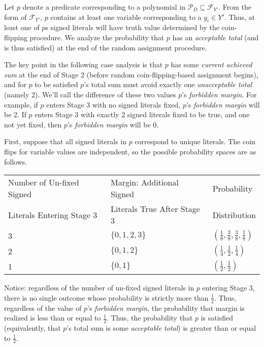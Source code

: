 \documentclass{article}
\begin{document}
Let $p$ denote a predicate corresponding to a polynomial in $\mathcal{P}_D\subseteq \mathcal{F}_{Y'}$. From the form of $\mathcal{F}_{Y'}$, $p$ contains at least one variable corresponding to a $y_i\in Y'$. Thus, at least one of $p$s signed literals will have truth value determined by the coin-flipping procedure. We analyze the probability that $p$ has an \textit{acceptable total} (and is thus satisfied) at the end of the random assignment procedure. 

The key point in the following case analysis is that $p$ has some \textit{current achieved sum} at the end of Stage 2 (before random coin-flipping-based assignment begins), and for $p$ to be satisfied $p$'s total sum must avoid exactly one \textit{unacceptable total} (namely 2). We'll call the difference of these two values $p$'s \textit{forbidden margin}. For example, if $p$ enters Stage 3 with no signed literals fixed, $p$'s \textit{forbidden margin} will be 2. If $p$ enters Stage 3 with exactly 2 signed literals fixed to be true, and one not yet fixed, then $p$'s \textit{forbidden margin} will be 0.  

First, suppose that all signed literals in $p$ correspond to unique literals. The coin flips for variable values are independent, so the possible probability spaces are as follows.\\

\renewcommand\arraystretch{1.3} 

\begin{tabular}{|l|l|l|} \hline
Number of Un-fixed Signed  & Margin: Additional Signed  & Probability  \\
Literals Entering Stage 3 & Literals True After Stage 3& Distribution  \\
\hline
3 & $\{0,1,2,3\}$& $(\frac{1}{8},\frac{3}{8},\frac{3}{8},\frac{1}{8})$\\ 
\hline
2 & $\{0,1,2\}$& $(\frac{1}{4},\frac{1}{2},\frac{1}{4})$\\ 
\hline
1 & $\{0,1\}$& $(\frac{1}{2},\frac{1}{2})$\\ 
\hline
\end{tabular}

\vspace{4mm}

Notice: regardless of the number of un-fixed signed literals in $p$ entering Stage 3, there is no single outcome whose probability is strictly more than $\frac{1}{2}$.  Thus, regardless of the value of $p$'s \textit{forbidden margin}, the probability that margin is realized is less than or equal to $\frac{1}{2}$. Thus, the probability that $p$ is satisfied (equivalently, that $p$'s total sum is some \textit{acceptable total}) is greater than or equal to $\frac{1}{2}$. 
\end{document}
